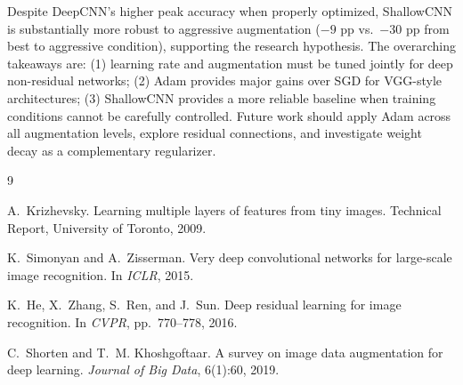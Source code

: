 \documentclass[11pt,letterpaper]{article}
\begin{document}
Despite DeepCNN's higher peak accuracy when properly optimized, ShallowCNN is substantially
more robust to aggressive augmentation ($-9$ pp vs.\ $-30$ pp from best to aggressive
condition), supporting the research hypothesis. The overarching takeaways are: (1)
learning rate and augmentation must be tuned jointly for deep non-residual networks; (2)
Adam provides major gains over SGD for VGG-style architectures; (3) ShallowCNN provides
a more reliable baseline when training conditions cannot be carefully controlled. Future
work should apply Adam across all augmentation levels, explore residual connections, and
investigate weight decay as a complementary regularizer.

\begin{thebibliography}{9}

A.~Krizhevsky.
\newblock Learning multiple layers of features from tiny images.
\newblock Technical Report, University of Toronto, 2009.

K.~Simonyan and A.~Zisserman.
\newblock Very deep convolutional networks for large-scale image recognition.
\newblock In \textit{ICLR}, 2015.

K.~He, X.~Zhang, S.~Ren, and J.~Sun.
\newblock Deep residual learning for image recognition.
\newblock In \textit{CVPR}, pp.~770--778, 2016.

C.~Shorten and T.~M. Khoshgoftaar.
\newblock A survey on image data augmentation for deep learning.
\newblock \textit{Journal of Big Data}, 6(1):60, 2019.

\end{thebibliography}
\end{document}
